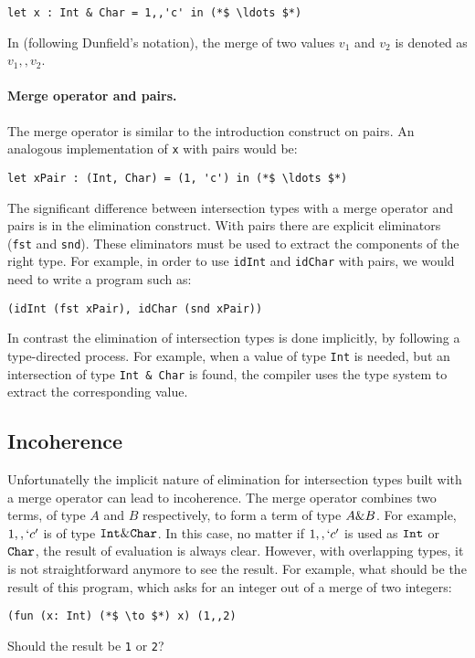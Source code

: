 \begin{lstlisting}
let x : Int & Char = 1,,'c' in (*$ \ldots $*)
\end{lstlisting}

\noindent In \namedis (following Dunfield's notation), the
merge of two values $v_1$ and $v_2$ is denoted as $v_1 ,, v_2$.

\paragraph{Merge operator and pairs.}
The merge operator is similar to the introduction construct on pairs.
An analogous implementation of \lstinline{x} with pairs would be:

\begin{lstlisting}
let xPair : (Int, Char) = (1, 'c') in (*$ \ldots $*)
\end{lstlisting}

\noindent The significant difference between intersection types with a
merge operator and pairs is in the elimination construct. With pairs
there are explicit eliminators (\lstinline{fst} and
\lstinline{snd}). These eliminators must be used to extract the
components of the right type. For example, in order to use
\lstinline{idInt} and \lstinline{idChar} with pairs, we would need to
write a program such as:

\begin{lstlisting}
(idInt (fst xPair), idChar (snd xPair))
\end{lstlisting}

\noindent In contrast the elimination of intersection types is done
implicitly, by following a type-directed process. For example,
when a value of type \lstinline{Int} is needed, but an intersection
of type \lstinline{Int & Char} is found, the compiler uses the
type system to extract the corresponding value.

\subsection{Incoherence}\label{subsec:incoherence}
Unfortunatelly the implicit nature of elimination for intersection
types built with a merge operator can lead to incoherence.
The merge operator combines two terms, of type $A$ and $B$
respectively, to form a term of type $A \& B$. For example,
$1 ,, `c'$ is of type $\texttt{Int} \& \texttt{Char}$. In this case, no
matter if $1 ,, `c'$ is used as $\texttt{Int}$ or $\texttt{Char}$, the result
of evaluation is always clear. However, with overlapping types, it is
not straightforward anymore to see the result. For example, what
should be the result of this program, which asks for an integer out of
a merge of two integers:
\begin{lstlisting}
(fun (x: Int) (*$ \to $*) x) (1,,2)
\end{lstlisting}
Should the result be \lstinline$1$ or \lstinline$2$?

